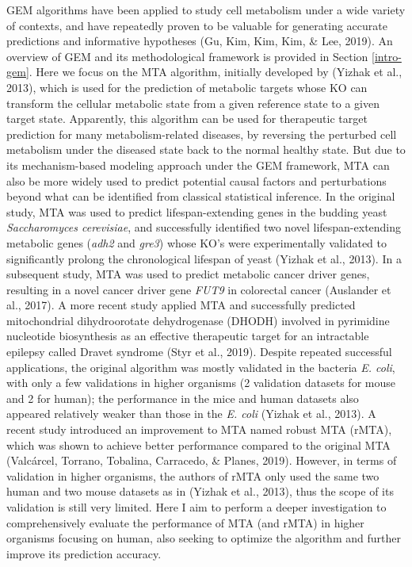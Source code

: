 \documentclass[12pt,twoside,openany,\mydriver]{thesis}  %
\begin{document}
GEM algorithms have been applied to study cell metabolism under a wide variety of contexts, and have repeatedly proven to be valuable for generating accurate predictions and informative hypotheses (Gu, Kim, Kim, Kim, \& Lee, 2019). An overview of GEM and its methodological framework is provided in Section \ref{intro-gem}. Here we focus on the MTA algorithm, initially developed by (Yizhak et al., 2013), which is used for the prediction of metabolic targets whose KO can transform the cellular metabolic state from a given reference state to a given target state. Apparently, this algorithm can be used for therapeutic target prediction for many metabolism-related diseases, by reversing the perturbed cell metabolism under the diseased state back to the normal healthy state. But due to its mechanism-based modeling approach under the GEM framework, MTA can also be more widely used to predict potential causal factors and perturbations beyond what can be identified from classical statistical inference. In the original study, MTA was used to predict lifespan-extending genes in the budding yeast \emph{Saccharomyces cerevisiae}, and successfully identified two novel lifespan-extending metabolic genes (\emph{adh2} and \emph{gre3}) whose KO's were experimentally validated to significantly prolong the chronological lifespan of yeast (Yizhak et al., 2013). In a subsequent study, MTA was used to predict metabolic cancer driver genes, resulting in a novel cancer driver gene \emph{FUT9} in colorectal cancer (Auslander et al., 2017). A more recent study applied MTA and successfully predicted mitochondrial dihydroorotate dehydrogenase (DHODH) involved in pyrimidine nucleotide biosynthesis as an effective therapeutic target for an intractable epilepsy called Dravet syndrome (Styr et al., 2019). Despite repeated successful applications, the original algorithm was mostly validated in the bacteria \emph{E. coli}, with only a few validations in higher organisms (2 validation datasets for mouse and 2 for human); the performance in the mice and human datasets also appeared relatively weaker than those in the \emph{E. coli} (Yizhak et al., 2013). A recent study introduced an improvement to MTA named robust MTA (rMTA), which was shown to achieve better performance compared to the original MTA (Valcárcel, Torrano, Tobalina, Carracedo, \& Planes, 2019). However, in terms of validation in higher organisms, the authors of rMTA only used the same two human and two mouse datasets as in (Yizhak et al., 2013), thus the scope of its validation is still very limited. Here I aim to perform a deeper investigation to comprehensively evaluate the performance of MTA (and rMTA) in higher organisms focusing on human, also seeking to optimize the algorithm and further improve its prediction accuracy.
\end{document}
